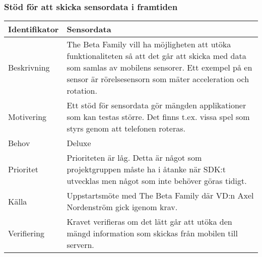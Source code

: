 \subsubsection{Stöd för att skicka sensordata i framtiden}
\begin{tabular}{ | p{65pt} | p{300pt} |}
  \hline
  Identifikator &
  Sensordata
  \\ \hline
  Beskrivning & 
  The Beta Family vill ha möjligheten att utöka funktionaliteten så att det går att skicka med data som samlas av mobilens sensorer. Ett exempel på en sensor är rörelsesensorn som mäter acceleration och rotation.
  \\ \hline
  Motivering &
  Ett stöd för sensordata gör mängden applikationer som kan testas större. Det finns t.ex. vissa spel som styrs genom att telefonen roteras.
  \\ \hline
  Behov &
  Deluxe
  \\ \hline
  Prioritet &
  Prioriteten är låg. Detta är något som projektgruppen måste ha i åtanke när SDK:t utvecklas men något som inte behöver göras tidigt.
  \\ \hline
  Källa &
  Uppstartsmöte med The Beta Family där VD:n Axel Nordenström gick igenom krav.
  \\ \hline
  Verifiering &
  Kravet verifieras om det lätt går att utöka den mängd information som skickas från mobilen till servern.
  \\ \hline
\end{tabular}

